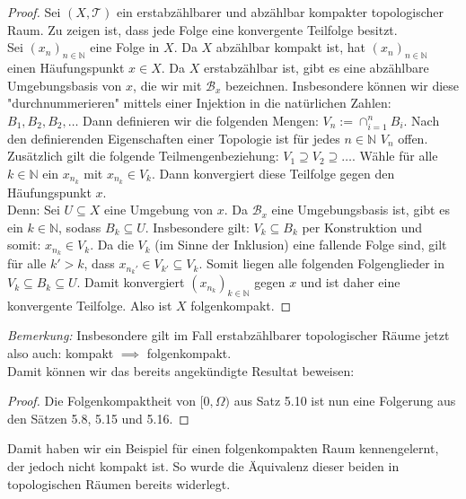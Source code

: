 \documentclass[11pt]{scrartcl}
\begin{document}
\begin{proof}
	Sei $(X,\mathcal T)$ ein erstabzählbarer und abzählbar kompakter topologischer Raum. Zu zeigen ist, dass jede Folge
	eine konvergente Teilfolge besitzt.\\
	Sei $(x_n)_{n\in\mathbb N}$ eine Folge in $X$. Da $X$ abzählbar kompakt ist, hat $(x_n)_{n\in\mathbb N}$ einen
	Häufungspunkt $x\in X$. Da $X$ erstabzählbar ist, gibt es eine abzählbare Umgebungsbasis von $x$, die wir mit $\mathcal B_x$ bezeichnen. Insbesondere
	können wir diese "durchnummerieren" mittels einer Injektion in die natürlichen Zahlen: $B_1,B_2,B_2,\dots$ Dann definieren wir die
	folgenden Mengen: $V_n:= \cap_{i=1}^n B_i$. Nach den definierenden Eigenschaften einer Topologie ist für jedes $n\in\mathbb N$ 
	$V_n$ offen. Zusätzlich gilt die folgende Teilmengenbeziehung: $V_1 \supseteq V_2 \supseteq \dots$. Wähle für alle $k\in\mathbb N$ ein $x_{n_k}$
	mit $x_{n_k}\in V_k$. Dann konvergiert diese Teilfolge gegen den Häufungspunkt $x$.\\
	Denn: Sei $U \subseteq X$ eine Umgebung von $x$. Da $\mathcal B_x$ eine Umgebungsbasis ist, gibt es ein $k\in\mathbb N$, sodass $ B_k \subseteq U$. 
	Insbesondere gilt: $ V_k \subseteq B_k$ per Konstruktion und somit: $x_{n_k}\in V_k$. Da die $V_k$ (im Sinne der Inklusion) eine fallende Folge
        sind, gilt für alle $k'>k$, dass $x_{n_k'}\in V_{k'} \subseteq V_k$. Somit liegen alle folgenden Folgenglieder in $V_k \subseteq B_k \subseteq U$.
	Damit konvergiert $(x_{n_k})_{k\in\mathbb N}$ gegen $x$ und ist daher eine konvergente Teilfolge. Also ist $X$ folgenkompakt.
\end{proof}
\textit{Bemerkung:} Insbesondere gilt im Fall erstabzählbarer topologischer Räume jetzt also auch: kompakt $\implies$ folgenkompakt.\\
Damit können wir das bereits angekündigte Resultat beweisen:
\begin{proof}
	Die Folgenkompaktheit von $[0, \Omega)$ aus Satz 5.10 ist nun eine Folgerung aus den Sätzen
	5.8, 5.15 und 5.16.
\end{proof}
\noindent Damit haben wir ein Beispiel für einen folgenkompakten Raum kennengelernt, der jedoch nicht kompakt ist.
So wurde die Äquivalenz dieser beiden in topologischen Räumen bereits widerlegt.
\end{document}
